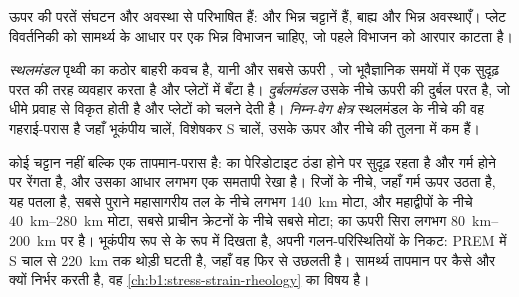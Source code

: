 ऊपर की परतें संघटन और अवस्था से परिभाषित हैं:  और  भिन्न चट्टानें हैं, बाह्य और  भिन्न अवस्थाएँ। प्लेट विवर्तनिकी को सामर्थ्य के आधार पर एक भिन्न विभाजन चाहिए, जो पहले विभाजन को आरपार काटता है।

\begin{definition}
\label{def:b1:layered-earth:lithosphere}
\emph{स्थलमंडल} पृथ्वी का कठोर बाहरी कवच है, यानी  और सबसे ऊपरी , जो भूवैज्ञानिक समयों में एक सुदृढ़ परत की तरह व्यवहार करता है और प्लेटों में बँटा है। \emph{दुर्बलमंडल} उसके नीचे ऊपरी  की दुर्बल परत है, जो धीमे प्रवाह से विकृत होती है और प्लेटों को चलने देती है। \emph{निम्न-वेग क्षेत्र} स्थलमंडल के नीचे की वह गहराई-परास है जहाँ भूकंपीय चालें, विशेषकर S चालें, उसके ऊपर और नीचे की तुलना में कम हैं।
\end{definition}

 कोई चट्टान नहीं बल्कि एक तापमान-परास है:  का पेरिडोटाइट ठंडा होने पर सुदृढ़ रहता है और गर्म होने पर रेंगता है, और उसका आधार लगभग एक समतापी रेखा है। रिजों के नीचे, जहाँ गर्म  ऊपर उठता है, यह पतला है, सबसे पुराने महासागरीय तल के नीचे लगभग \qty{140}{km} मोटा, और महाद्वीपों के नीचे \qtyrange{40}{280}{km} मोटा, सबसे प्राचीन क्रेटनों के नीचे सबसे मोटा;  का ऊपरी सिरा लगभग \qtyrange{80}{200}{km} पर है। भूकंपीय रूप से   के रूप में दिखता है, अपनी गलन-परिस्थितियों के निकट: PREM में S चाल  से \qty{220}{km} तक थोड़ी घटती है, जहाँ वह फिर से उछलती है। सामर्थ्य तापमान पर कैसे और क्यों निर्भर करती है, वह \cref{ch:b1:stress-strain-rheology} का विषय है।

